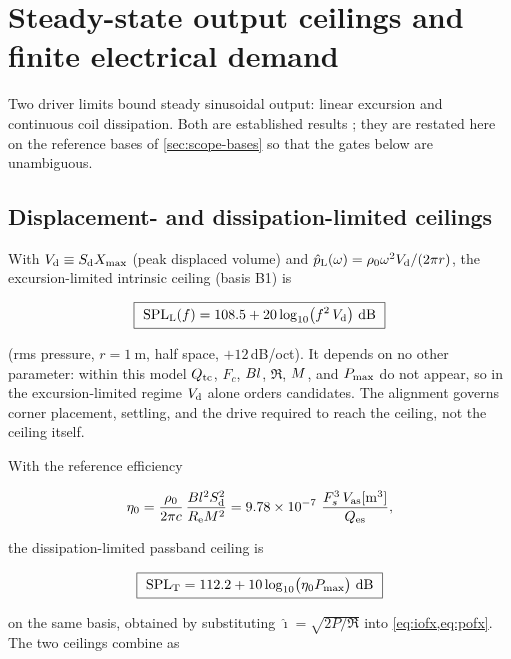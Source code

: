 \section{Steady-state output ceilings and finite electrical demand}
\label{sec:freq}

Two driver limits bound steady sinusoidal output: linear excursion and
continuous coil dissipation. Both are established results
\cite{small1972direct}; they are restated here on the reference bases of
\cref{sec:scope-bases} so that the gates below are unambiguous.

\subsection{Displacement- and dissipation-limited ceilings}
\label{sec:freq-ceilings}

With $V_{\mathrm{d}}\equiv S_{\mathrm{d}}X_{\mathrm{max}}$ (peak displaced volume) and
$\hat p_{\mathrm L}(\omega)=\rho_0\omega^2V_{\mathrm{d}}/(2\pi r)$, the
excursion-limited intrinsic ceiling (basis B1) is

\begin{equation}
	\boxed{\ \mathrm{SPL}_{\mathrm{L}}(f)=
			108.5+20\log_{10}\!\big(f^2\,V_{\mathrm{d}}\big)\ \mathrm{dB}\ }
	\label{eq:SPLL}
\end{equation}

(rms pressure, $r=\SI{1}{\meter}$, half space, $+12$\,dB/oct). It depends
on no other parameter: within this model $Q_{\mathrm{tc}}$, $F_c$, $Bl$, $\Re$,
$M$, and $P_{\mathrm{max}}$ do not appear, so in the excursion-limited regime
$V_{\mathrm{d}}$ alone orders candidates. The alignment governs corner placement,
settling, and the drive required to reach the ceiling, not the ceiling
itself.

With the reference efficiency

\begin{equation}
	\eta_0 =
		\frac{\rho_0}{2\pi c} \,
		\frac{Bl^2S_{\mathrm{d}}^2}{R_{\mathrm{e}}M^2}
		= 9.78\times10^{-7}\ \frac{F_s^3\,V_{\mathrm{as}}[\mathrm{m^3}]}{Q_{\mathrm{es}}},
	\label{eq:eta0}
\end{equation}

the dissipation-limited passband ceiling is

\begin{equation}
	\boxed{\ \mathrm{SPL}_{\mathrm{T}}=112.2+10\log_{10}\!\big(\eta_0\Pmax\big)\ \mathrm{dB}\ }
	\label{eq:SPLT}
\end{equation}

on the same basis, obtained by substituting $\hat\imath=\sqrt{2P/\Re}$ into
\cref{eq:iofx,eq:pofx}. The two ceilings combine as

